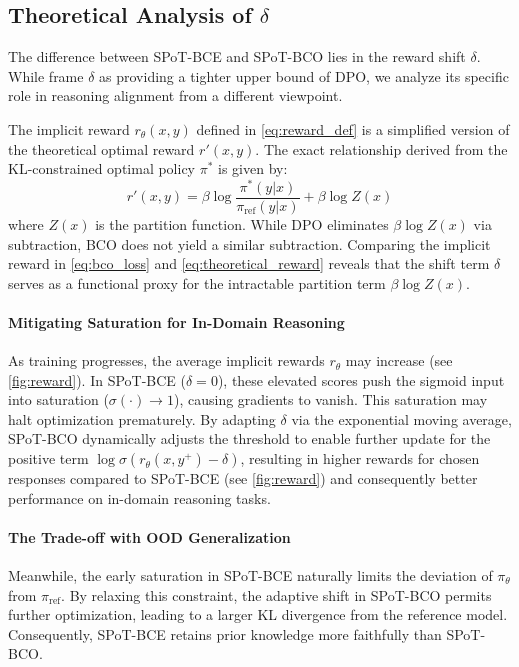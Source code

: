 \documentclass{article}
\theoremstyle{plain}
\theoremstyle{definition}
\theoremstyle{remark}
\begin{document}
\subsection{Theoretical Analysis of $\delta$}
The difference between SPoT-BCE and SPoT-BCO lies in the reward shift $\delta$. While \citet{jung2025binary} frame $\delta$ as providing a tighter upper bound of DPO, we analyze its specific role in reasoning alignment from a different viewpoint.

The implicit reward $r_\theta(x,y)$ defined in \cref{eq:reward_def} is a simplified version of the theoretical optimal reward $r'(x,y)$. The exact relationship derived from the KL-constrained optimal policy $\pi^*$ is given by:
\begin{equation}
    r'(x,y) = \beta \log \frac{\pi^*(y|x)}{\pi_{\text{ref}}(y|x)} + \beta \log Z(x)
    \label{eq:theoretical_reward}
\end{equation}
where $Z(x)$ is the partition function. While DPO eliminates $\beta \log Z(x)$ via subtraction, BCO does not yield a similar subtraction. Comparing the implicit reward in \cref{eq:bco_loss} and \cref{eq:theoretical_reward} reveals that the shift term $\delta$ serves as a functional proxy for the intractable partition term $\beta \log Z(x)$.

\paragraph{Mitigating Saturation for In-Domain Reasoning}
As training progresses, the average implicit rewards $r_\theta$ may increase (see \cref{fig:reward}). In SPoT-BCE ($\delta=0$), these elevated scores push the sigmoid input into saturation ($\sigma(\cdot) \to 1$), causing gradients to vanish. This saturation may halt optimization prematurely. By adapting $\delta$ via the exponential moving average, SPoT-BCO dynamically adjusts the threshold to enable further update for the positive term $\log \sigma\left(r_\theta(x, y^+)\!-\!\delta\right)$, resulting in higher rewards for chosen responses compared to SPoT-BCE (see \cref{fig:reward}) and consequently better performance on in-domain reasoning tasks.

\paragraph{The Trade-off with OOD Generalization}
Meanwhile, the early saturation in SPoT-BCE naturally limits the deviation of $\pi_\theta$ from $\pi_{\text{ref}}$. By relaxing this constraint, the adaptive shift in SPoT-BCO permits further optimization, leading to a larger KL divergence from the reference model. Consequently, SPoT-BCE retains prior knowledge more faithfully than SPoT-BCO.
\end{document}
